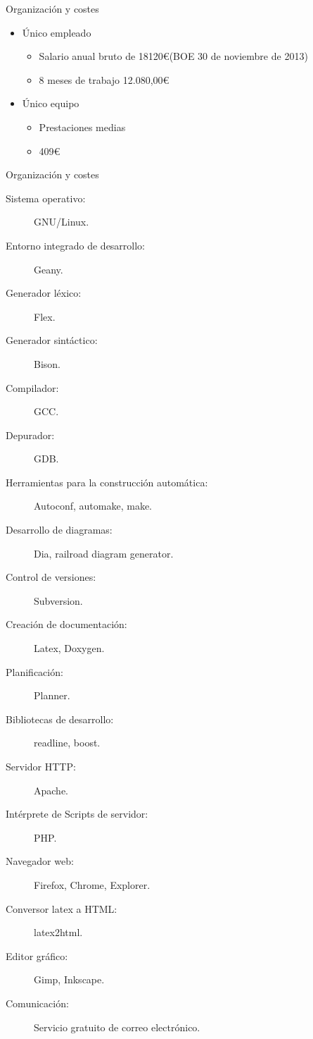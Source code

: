 \documentclass[spanish]{beamer}
\begin{document}
\begin{frame}{Organización y costes}
    \begin{itemize}
      \item Único empleado  
      \begin{itemize}
         \item Salario anual bruto de 18120\euro (BOE 30 de noviembre de 2013)
         \item 8 meses de trabajo  12.080,00\euro
      \end{itemize}
      \item Único equipo
      \begin{itemize}
         \item Prestaciones medias
         \item 409\euro
      \end{itemize}
   \end{itemize}
\end{frame}

\begin{frame}{Organización y costes}
   \tiny {
    \begin{description}
      \item [Sistema operativo:] GNU/Linux. 
      \item [Entorno integrado de desarrollo:] Geany.
      \item [Generador léxico:] Flex.
      \item [Generador sintáctico:] Bison.
      \item [Compilador:] GCC.
      \item [Depurador:] GDB.
      \item [Herramientas para la construcción automática:] Autoconf, automake, make.
      \item [Desarrollo de diagramas:] Dia, railroad diagram generator.
      \item [Control de versiones:] Subversion.
      \item [Creación de documentación:] Latex, Doxygen.
      \item [Planificación:] Planner.
      \item [Bibliotecas de desarrollo:] readline, boost. 
      \item [Servidor HTTP: ] Apache.
      \item [Intérprete de Scripts de servidor:] PHP.
      \item [Navegador web:] Firefox, Chrome, Explorer.
      \item [Conversor latex a HTML:] latex2html.
      \item [Editor gráfico:] Gimp, Inkscape.
      \item [Comunicación:] Servicio gratuito de correo electrónico. 
      \end{description}
      }
\end{frame}
\end{document}
